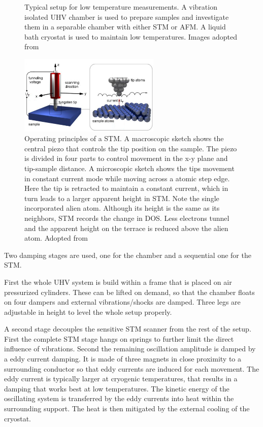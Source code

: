 \begin{figure}[ht]
{		\label{fig:STM-cryo}
	}
	\caption{Typical setup for low temperature measurements. A vibration isolated UHV chamber is used to prepare samples and investigate them in a separable chamber with either STM or AFM. A liquid bath cryostat is used to maintain low temperatures. Images adopted from \cite{diss-knud}}
	\label{fig:STM}
\end{figure}

\begin{figure}\centering
	
\includegraphics[width=0.6\textwidth]{./images/stm-rutgers-modified.jpg}
	\caption{Operating principles of a STM. A macroscopic sketch shows the central piezo that controls the tip position on the sample. The piezo is divided in four parts to control movement in the x-y plane and tip-sample distance. A microscopic sketch shows the tips movement in constant current mode while moving across a atomic step edge. Here the tip is retracted to maintain a constant current, which in turn leads to a larger apparent height in STM. Note the single incorporated alien atom. Although its height is the same as its neighbors, STM records the change in DOS. Less electrons tunnel and the apparent height on the terrace is reduced above the alien atom. Adopted from \cite{STM-rutgers}}
\label{fig:STM-tip}
\end{figure}

Two damping stages are used, one for the chamber and a sequential one for the STM.

First the whole UHV system is build within a frame that is placed on air pressurized cylinders. These can be lifted on demand, so that the chamber floats on four dampers and external vibrations/shocks are damped. Three legs are adjustable in height to level the whole setup properly.

A second stage decouples the sensitive STM scanner from the rest of the setup. First the complete STM stage hangs on springs to further limit the direct influence of vibrations. Second the remaining oscillation amplitude is damped by a eddy current damping. It is made of three magnets in close proximity to a surrounding conductor so that eddy currents are induced for each movement. The eddy current is typically larger at cryogenic temperatures, that results in a damping that works best at low temperatures. The kinetic energy of the oscillating system is transferred by the eddy currents into heat within the surrounding support. The heat is then mitigated by the external cooling of the cryostat.

